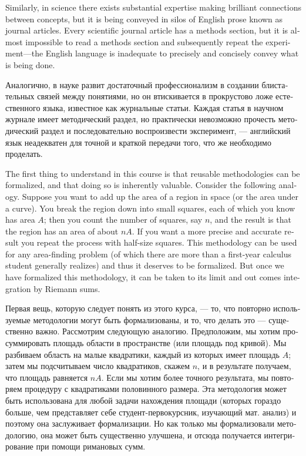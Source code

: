 \documentclass[a4paper]{book}
\theoremstyle{myth}
\begin{document}
\begin{english}
Similarly, in science there exists substantial expertise making brilliant connections between concepts, but it is being conveyed in silos of English prose known as journal articles. Every scientific journal article has a methods section, but it is almost impossible to read a methods section and subsequently repeat the experiment---the English language is inadequate to precisely and concisely convey what is being done.

\begin{russian}Аналогично, в науке развит достаточный профессионализм в создании блистательных связей между понятиями, но он втискивается в прокрустово ложе естественного языка, известное как журнальные статьи. Каждая статья в научном журнале имеет методический раздел, но практически невозможно прочесть методический раздел и последовательно воспроизвести эксперимент, — английский язык неадекватен для точной и краткой передачи того, что же необходимо проделать. \end{russian}

The first thing to understand in this course is that reusable methodologies can be formalized, and that doing so is inherently valuable. Consider the following analogy. Suppose you want to add up the area of a region in space (or the area under a curve). You break the region down into small squares, each of which you know has area $A$; then you count the number of squares, say $n$, and the result is that the region has an area of about $nA$. If you want a more precise and accurate result you repeat the process with half-size squares. This methodology can be used for any area-finding problem (of which there are more than a first-year calculus student generally realizes) and thus it deserves to be formalized. But once we have formalized this methodology, it can be taken to its limit and out comes integration by Riemann sums.

\begin{russian}Первая вещь, которую следует понять из этого курса, — то, что повторно используемые методологии могут быть формализованы, и то, что делать это — существенно важно. Рассмотрим следующую аналогию. Предположим, мы хотим просуммировать площадь области в пространстве (или площадь под кривой). Мы разбиваем область на малые квадратики, каждый из которых имеет площадь $A$; затем мы подсчитываем число квадратиков, скажем $n$, и в результате получаем, что площадь равняется $nA$. Если мы хотим более точного результата, мы повторяем процедуру с квадратиками половинного размера. Эта методология может быть использована для любой задачи нахождения площади (которых гораздо больше, чем представляет себе студент-первокурсник, изучающий мат. анализ) и поэтому она заслуживает формализации. Но как только мы формализовали методологию, она может быть существенно улучшена, и отсюда получается интегрирование при помощи римановых сумм. \end{russian}


\end{english}
\end{document}
